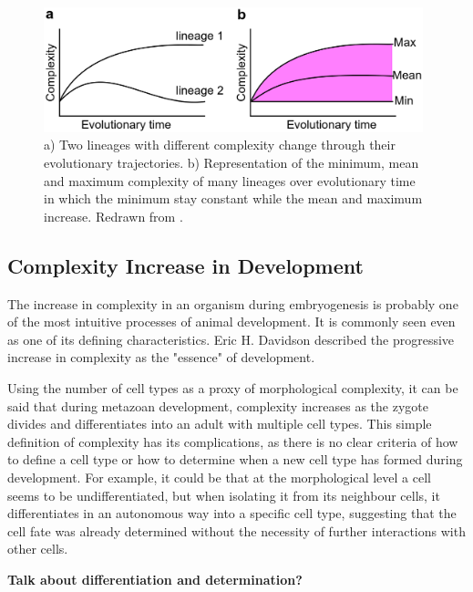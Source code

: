 \begin{figure}[t]
  \includegraphics[width=11cm]{./Images/complexity_min.jpeg}
  \centering
  \caption{a) Two lineages with different complexity change through their evolutionary trajectories.
  b) Representation of the minimum, mean and maximum complexity of many lineages over evolutionary time in which the minimum stay constant while the mean and maximum increase.
Redrawn from \citep{Arthur2010}.
 }
  \label{fig:Complexity_min}
\end{figure}

\subsection{Complexity Increase in Development}

The increase in complexity in an organism during embryogenesis is probably one of the most intuitive processes of animal development. It is commonly seen even as one of its defining characteristics.
Eric H. Davidson described the progressive increase in complexity as the "essence" of development\citep{Davidson2001}.

Using the number of cell types as a proxy of morphological complexity, it can be said that during metazoan development, complexity increases as the zygote divides and differentiates into an adult with multiple cell types. 
This simple definition of complexity has its complications, as there is no clear criteria of how to define a cell type or how to determine when a new cell type has formed during development. 
For example, it could be that at the morphological level a cell seems to be undifferentiated, but when isolating it from its neighbour cells, it differentiates in an autonomous way into a specific cell type, suggesting that the cell fate was already determined without the necessity of further interactions with other cells.

\textbf{Talk about differentiation and determination?}

